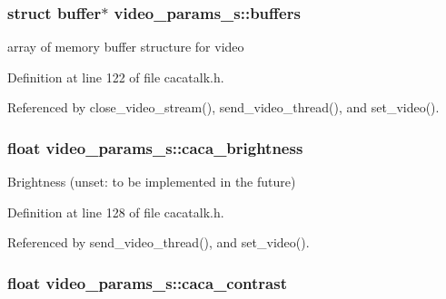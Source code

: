 \hypertarget{structvideo__params__s_af22e9e81ce6b788b4357d70f43dc1260}{
\subsubsection[{buffers}]{\setlength{\rightskip}{0pt plus 5cm}struct {\bf buffer}$\ast$ {\bf video\-\_\-params\-\_\-s\-::buffers}}}\label{structvideo__params__s_af22e9e81ce6b788b4357d70f43dc1260}


array of memory buffer structure for video 



\-Definition at line 122 of file cacatalk.\-h.



\-Referenced by close\-\_\-video\-\_\-stream(), send\-\_\-video\-\_\-thread(), and set\-\_\-video().

\hypertarget{structvideo__params__s_ab2e01e01864e7fb07fdc3ec727edf8ab}{
\subsubsection[{caca\-\_\-brightness}]{\setlength{\rightskip}{0pt plus 5cm}float {\bf video\-\_\-params\-\_\-s\-::caca\-\_\-brightness}}}\label{structvideo__params__s_ab2e01e01864e7fb07fdc3ec727edf8ab}


\-Brightness (unset\-: to be implemented in the future) 



\-Definition at line 128 of file cacatalk.\-h.



\-Referenced by send\-\_\-video\-\_\-thread(), and set\-\_\-video().

\hypertarget{structvideo__params__s_aa080edd1e1614a24f4496118ae33bfbc}{
\subsubsection[{caca\-\_\-contrast}]{\setlength{\rightskip}{0pt plus 5cm}float {\bf video\-\_\-params\-\_\-s\-::caca\-\_\-contrast}}}\label{structvideo__params__s_aa080edd1e1614a24f4496118ae33bfbc}


